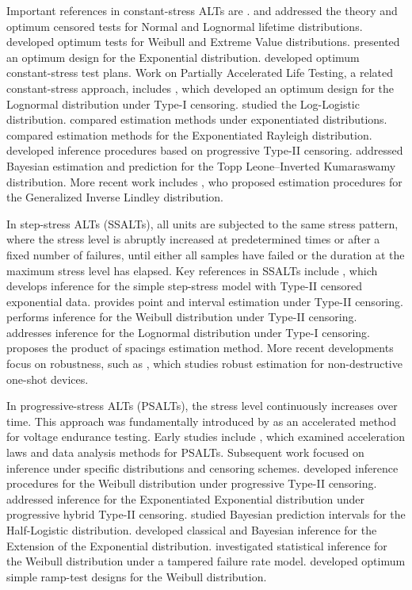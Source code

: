 \documentclass{article}
\begin{document}
Important references in constant-stress ALTs are \cite{meeker1975, kielpinski1975, nelson1976, nelson2009}. \cite{kielpinski1975} and \cite{nelson1976} addressed the theory and optimum censored tests for Normal and Lognormal lifetime distributions. \cite{meeker1975} developed optimum tests for Weibull and Extreme Value distributions. \cite{bai1991} presented an optimum design for the Exponential distribution. \cite{yang1994} developed optimum constant-stress test plans. Work on Partially Accelerated Life Testing, a related constant-stress approach, includes \cite{bai1993}, which developed an optimum design for the Lognormal distribution under Type-I censoring. \cite{hyun2015} studied the Log-Logistic distribution. \cite{abdel2016} compared estimation methods under exponentiated distributions. \cite{nassar2018} compared estimation methods for the Exponentiated Rayleigh distribution. \cite{elsagheer2018} developed inference procedures based on progressive Type-II censoring. \cite{aldayian2021} addressed Bayesian estimation and prediction for the Topp Leone–Inverted Kumaraswamy distribution. More recent work includes \cite{kumar2022}, who proposed estimation procedures for the Generalized Inverse Lindley distribution.


In step-stress ALTs (SSALTs), all units are subjected to the same stress pattern, where the stress level is abruptly increased at predetermined times or after a fixed number of failures, until either all samples have failed or the duration at the maximum stress level has elapsed. Key references in SSALTs include \cite{xiong1998}, which develops inference for the simple step-stress model with Type-II censored exponential data. \cite{balakrishnan2007} provides point and interval estimation under Type-II censoring. \cite{kateri2008} performs inference for the Weibull distribution under Type-II censoring. \cite{balakrishnan2009a} addresses inference for the Lognormal distribution under Type-I censoring. \cite{kateri2024} proposes the product of spacings estimation method. More recent developments focus on robustness, such as \cite{balakrishnan2023a}, which studies robust estimation for non-destructive one-shot devices.


In progressive-stress ALTs (PSALTs), the stress level continuously increases over time. This approach was fundamentally introduced by \cite{starr1961} as an accelerated method for voltage endurance testing. Early studies include \cite{yin1987}, which examined acceleration laws and data analysis methods for PSALTs. Subsequent work focused on inference under specific distributions and censoring schemes. \cite{abdel2011} developed inference procedures for the Weibull distribution under progressive Type-II censoring. \cite{abdel2015} addressed inference for the Exponentiated Exponential distribution under progressive hybrid Type-II censoring. \cite{alhussaini2015} studied Bayesian prediction intervals for the Half-Logistic distribution. \cite{mohie2017} developed classical and Bayesian inference for the Extension of the Exponential distribution. \cite{ronghua2004} investigated statistical inference for the Weibull distribution under a tampered failure rate model. \cite{bai1992} developed optimum simple ramp-test designs for the Weibull distribution.
\end{document}
